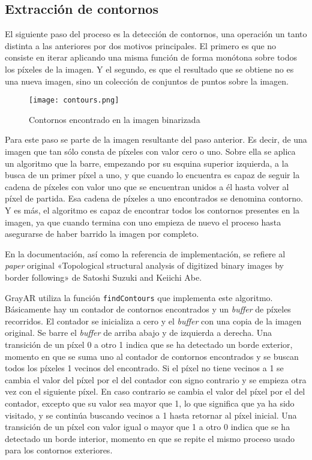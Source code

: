 \subsection{Extracción de contornos}
El siguiente paso del proceso es la detección de contornos, una operación un tanto distinta a las anteriores por dos motivos principales. El primero es que no consiste en iterar aplicando una misma función de forma monótona sobre todos los píxeles de la imagen. Y el segundo, es que el resultado que se obtiene no es una nueva imagen, sino un colección de conjuntos de puntos sobre la imagen.

\begin{figure}[h] 
  \centering
  \texttt{[image: contours.png]}
  \caption{Contornos encontrado en la imagen binarizada}
  \label{fig:contours}
\end{figure}

Para este paso se parte de la imagen resultante del paso anterior. Es decir, de una imagen que tan sólo consta de píxeles con valor cero o uno. Sobre ella se aplica un algoritmo que la barre, empezando por su esquina superior izquierda, a la busca de un primer píxel a uno, y que cuando lo
encuentra es capaz de seguir la cadena de píxeles con valor uno que se encuentran unidos a él hasta volver al píxel de partida. Esa cadena de píxeles a uno encontrados se denomina contorno. Y es más, el algoritmo es capaz de encontrar todos los contornos presentes en la imagen, ya que cuando termina con uno empieza de nuevo el proceso hasta asegurarse de haber barrido la imagen por completo.

En la documentación, así como la referencia de implementación, se refiere al \textit{paper} original «Topological structural analysis of digitized binary images by border following» de Satoshi Suzuki and Keiichi Abe. 

GrayAR utiliza la función \texttt{findContours} que implementa este algoritmo. Básicamente hay un contador de contornos encontrados y un \textit{buffer} de píxeles recorridos. El contador se inicializa a cero y el \textit{buffer} con una copia de la imagen original. Se barre el \textit{buffer} de arriba abajo y de izquierda a derecha. Una transición de un píxel 0 a otro 1 indica que se ha detectado un borde exterior, momento en que se suma uno al contador de contornos encontrados y se buscan todos los píxeles 1 vecinos del encontrado. Si el píxel no tiene vecinos a 1 se cambia el valor del píxel por el del contador con signo contrario y se empieza otra vez con el siguiente píxel. En caso
contrario se cambia el valor del píxel por el del contador, excepto que su valor sea mayor que 1, lo que significa que ya ha sido visitado, y se continúa buscando vecinos a 1 hasta retornar al píxel inicial. Una transición de un píxel con valor igual o mayor que 1 a otro 0 indica que se ha
detectado un borde interior, momento en que se repite el mismo proceso usado para los contornos exteriores.

